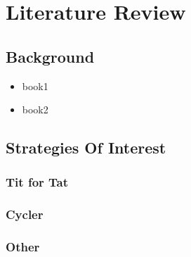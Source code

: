 
\chapter{Literature Review}\label{ch:literature}
\section{Background}\label{sec:background}
    \begin{itemize}
        \item book1
        \item book2
        
    \end{itemize}


\section{Strategies Of Interest}\label{sec:strategiesOfInterest}
        \subsection{Tit for Tat}
\subsection{Cycler}\label{subsec:descCycler}
        \subsection{Other}